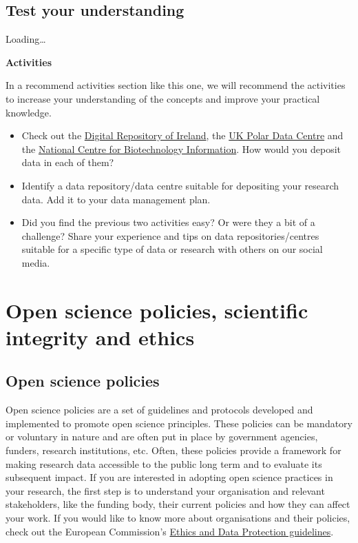 \documentclass[
]{book}
\begin{document}
\hypertarget{test-your-understanding-6}{%
\section{Test your understanding}\label{test-your-understanding-6}}

Loading\ldots{}

\textbf{Activities}

In a recommend activities section like this one, we will recommend the activities to increase your understanding of the concepts and improve your practical knowledge.

\begin{itemize}
\item
  Check out the \href{https://dri.ie/}{Digital Repository of Ireland}, the \href{https://www.bas.ac.uk/data/uk-pdc/}{UK Polar Data Centre} and the \href{https://www.ncbi.nlm.nih.gov/}{National Centre for Biotechnology Information}. How would you deposit data in each of them?
\item
  Identify a data repository/data centre suitable for depositing your research data. Add it to your data management plan.
\item
  Did you find the previous two activities easy? Or were they a bit of a challenge? Share your experience and tips on data repositories/centres suitable for a specific type of data or research with others on our social media.
\end{itemize}

\hypertarget{open-science-policies-scientific-integrity-and-ethics}{%
\chapter{Open science policies, scientific integrity and ethics}\label{open-science-policies-scientific-integrity-and-ethics}}

\hypertarget{open-science-policies}{%
\section{Open science policies}\label{open-science-policies}}

Open science policies are a set of guidelines and protocols developed and implemented to promote open science principles. These policies can be mandatory or voluntary in nature and are often put in place by government agencies, funders, research institutions, etc. Often, these policies provide a framework for making research data accessible to the public long term and to evaluate its subsequent impact. If you are interested in adopting open science practices in your research, the first step is to understand your organisation and relevant stakeholders, like the funding body, their current policies and how they can affect your work. If you would like to know more about organisations and their policies, check out the European Commission's \href{https://ec.europa.eu/research/participants/data/ref/h2020/grants_manual/hi/ethics/h2020_hi_ethics-data-protection_en.pdf}{Ethics and Data Protection guidelines}.
\end{document}
